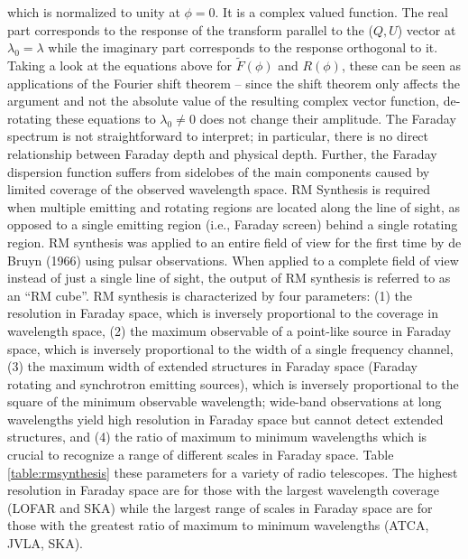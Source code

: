 \documentclass[a4paper,10pt]{article}
\begin{document}
{\noindent}which is normalized to unity at $\phi=0$. It is a complex valued function. The real part corresponds to the response of the transform parallel to the ($Q,U$) vector at $\lambda_0=\lambda$ while the imaginary part corresponds to the response orthogonal to it. Taking a look at the equations above for $\tilde{F}(\phi)$ and $R(\phi)$, these can be seen as applications of the Fourier shift theorem -- since the shift theorem only affects the argument and not the absolute value of the resulting complex vector function, de-rotating these equations to $\lambda_0\neq0$ does not change their amplitude. The Faraday spectrum is not straightforward to interpret; in particular, there is no direct relationship between Faraday depth and physical depth. Further, the Faraday dispersion function suffers from sidelobes of the main components caused by limited coverage of the observed wavelength space. RM Synthesis is required when multiple emitting and rotating regions are located along the line of sight, as opposed to a single emitting region (i.e., Faraday screen) behind a single rotating region. RM synthesis was applied to an entire field of view for the first time by de Bruyn (1966) using pulsar observations. When applied to a complete field of view instead of just a single line of sight, the output of RM synthesis is referred to as an ``RM cube''. RM synthesis is characterized by four parameters: (1) the resolution in Faraday space, which is inversely proportional to the coverage in wavelength space, (2) the maximum observable of a point-like source in Faraday space, which is inversely proportional to the width of a single frequency channel, (3) the maximum width of extended structures in Faraday space (Faraday rotating and synchrotron emitting sources), which is inversely proportional to the square of the minimum observable wavelength; wide-band observations at long wavelengths yield high resolution in Faraday space but cannot detect extended structures, and (4) the ratio of maximum to minimum wavelengths which is crucial to recognize a range of different scales in Faraday space. Table \ref{table:rmsynthesis} these parameters for a variety of radio telescopes. The highest resolution in Faraday space are for those with the largest wavelength coverage (LOFAR and SKA) while the largest range of scales in Faraday space are for those with the greatest ratio of maximum to minimum wavelengths (ATCA, JVLA, SKA).
\end{document}

